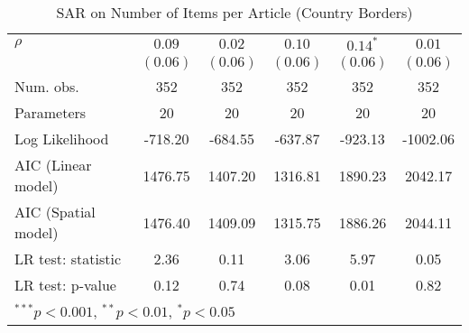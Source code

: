 \begin{table}[!h]
\begin{center}
\begin{tabular}{l c c c c c }
$\rho$                  & $0.09$       & $0.02$       & $0.10$       & $0.14^{*}$   & $0.01$       \\
                        & $(0.06)$     & $(0.06)$     & $(0.06)$     & $(0.06)$     & $(0.06)$     \\
\midrule
Num. obs.               & 352          & 352          & 352          & 352          & 352          \\
Parameters              & 20           & 20           & 20           & 20           & 20           \\
Log Likelihood          & -718.20      & -684.55      & -637.87      & -923.13      & -1002.06     \\
AIC (Linear model)      & 1476.75      & 1407.20      & 1316.81      & 1890.23      & 2042.17      \\
AIC (Spatial model)     & 1476.40      & 1409.09      & 1315.75      & 1886.26      & 2044.11      \\
LR test: statistic      & 2.36         & 0.11         & 3.06         & 5.97         & 0.05         \\
LR test: p-value        & 0.12         & 0.74         & 0.08         & 0.01         & 0.82         \\
\bottomrule
\multicolumn{6}{l}{\scriptsize{$^{***}p<0.001$, $^{**}p<0.01$, $^*p<0.05$}}
\end{tabular}
\caption{SAR on Number of Items per Article (Country Borders)}
\label{table:coefficients}
\end{center}
\end{table}
